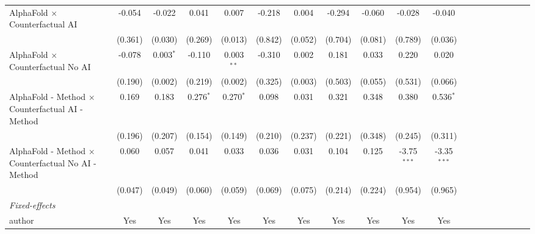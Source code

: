 \begin{tabular}{lcccccccccccccccccc}
   AlphaFold $\times$ Counterfactual AI                       & -0.054        & -0.022        & 0.041        & 0.007         & -0.218  & 0.004   & -0.294        & -0.060         & -0.028        & -0.040        &       &       &       &       &      &      &      &   \\   
                                                              & (0.361)       & (0.030)       & (0.269)      & (0.013)       & (0.842) & (0.052) & (0.704)       & (0.081)        & (0.789)       & (0.036)       &       &       &       &       &      &      &      &   \\   
   AlphaFold $\times$ Counterfactual No AI                    & -0.078        & 0.003$^{*}$   & -0.110       & 0.003$^{**}$  & -0.310  & 0.002   & 0.181         & 0.033          & 0.220         & 0.020         &       &       &       &       &      &      &      &   \\   
                                                              & (0.190)       & (0.002)       & (0.219)      & (0.002)       & (0.325) & (0.003) & (0.503)       & (0.055)        & (0.531)       & (0.066)       &       &       &       &       &      &      &      &   \\   
   AlphaFold - Method $\times$ Counterfactual AI - Method     & 0.169         & 0.183         & 0.276$^{*}$  & 0.270$^{*}$   & 0.098   & 0.031   & 0.321         & 0.348          & 0.380         & 0.536$^{*}$   &       &       &       &       &      &      &      &   \\   
                                                              & (0.196)       & (0.207)       & (0.154)      & (0.149)       & (0.210) & (0.237) & (0.221)       & (0.348)        & (0.245)       & (0.311)       &       &       &       &       &      &      &      &   \\   
   AlphaFold - Method $\times$ Counterfactual No AI - Method  & 0.060         & 0.057         & 0.041        & 0.033         & 0.036   & 0.031   & 0.104         & 0.125          & -3.75$^{***}$ & -3.35$^{***}$ &       &       &       &       &      &      &      &   \\   
                                                              & (0.047)       & (0.049)       & (0.060)      & (0.059)       & (0.069) & (0.075) & (0.214)       & (0.224)        & (0.954)       & (0.965)       &       &       &       &       &      &      &      &   \\   
   \midrule
   \emph{Fixed-effects}\\
   author                                                     & Yes           & Yes           & Yes          & Yes           & Yes     & Yes     & Yes           & Yes            & Yes           & Yes           &       &       &       &       &      &      &      & \\  

\end{tabular}
